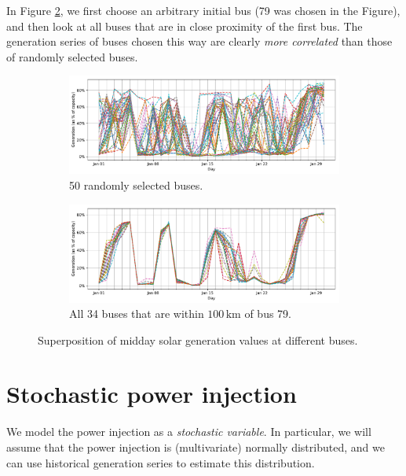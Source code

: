 \documentclass[main.tex]{subfiles}
\begin{document}
In Figure \ref{fig:solarcovclose}, we first choose an arbitrary initial bus (79 was chosen in the Figure), and then look at all buses that are in close proximity of the first bus. The generation series of buses chosen this way are clearly \emph{more correlated} than those of randomly selected buses.

\begin{figure}[ht]
\begin{subfigure}{\textwidth}
    \centering
    \includegraphics[width=\textwidth]{img/solar_cov_random.pdf}
    \caption{50 randomly selected buses.}\label{fig:solarcovrandom}
\end{subfigure}
\begin{subfigure}{\textwidth}
    \centering
    \includegraphics[width=\textwidth]{img/solar_cov_close.pdf}
    \caption{All 34 buses that are within $100\,\si{\kilo\meter}$ of bus 79.}\label{fig:solarcovclose}
\end{subfigure}
    \caption{Superposition of midday solar generation values at different buses.}\label{fig:solarcov}
\end{figure}

\section{Stochastic power injection}
We model the power injection as a \emph{stochastic variable}. In particular, we will assume that the power injection is (multivariate) normally distributed, and we can use historical generation series to estimate this distribution. 
\end{document}
